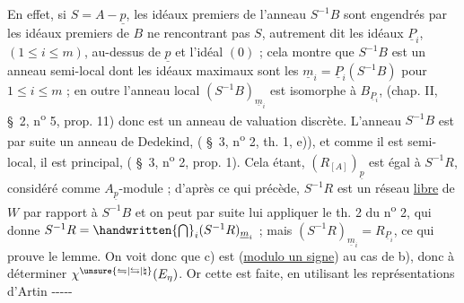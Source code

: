 En effet, si $S=A-\underline p$, les idéaux premiers de l'anneau $S^{-1}B$ sont engendrés par les idéaux premiers de $B$ ne rencontrant pas $S$, autrement dit les idéaux $\underline P_i$, $(1\leq i\leq m)$, au-dessus de $\underline p$ et l'idéal $(0)$ ; cela montre que $S^{-1}B$ est un anneau semi-local dont les idéaux maximaux sont les $\underline m_i=\underline P_i(S^{-1}B)$ pour $1\leq i\leq m$ ; en outre l'anneau local $(S^{-1}B)_{\underline m_i}$ est isomorphe à $B_{\underline P_i}$, (chap. II, \S~2, n\textsuperscript{o} 5, prop. 11)\unsure{,} donc est un anneau de valuation discrète. L'anneau $S^{-1}B$ est par suite un anneau de Dedekind, ( \S~3, n\textsuperscript{o} 2, th. 1, e)), et comme il est semi-local, il est principal, ( \S~3, n\textsuperscript{o} 2, prop. 1). Cela étant, $(R_{[A]})_{\underline p}$ est égal à $S^{-1}R$, considéré comme $A_{\underline p}$-module ; d'après ce qui précède, $S^{-1}R$ est un réseau \uline{libre} de $W$ par rapport à $S^{-1}B$ et on peut par suite lui appliquer le th. 2 du n\textsuperscript{o} 2, qui donne $S^{-1}R=\handwritten{\bigcap}_i(S^{-1}R)_{\underline m_i}$ ; mais $(S^{-1}R)_{\underline m_i}=R_{\underline P_i}$, ce qui prouve le lemme.
On voit donc que c) est  (\uline{modulo un signe}) au cas de b), donc à déterminer $\chi^{\unsure{\leftrightharpoons|\leftrightarrows|\natural}}(E_\eta)$. Or cette  est faite, en utilisant les représentations d'Artin -{}-{}-{}-{}-
